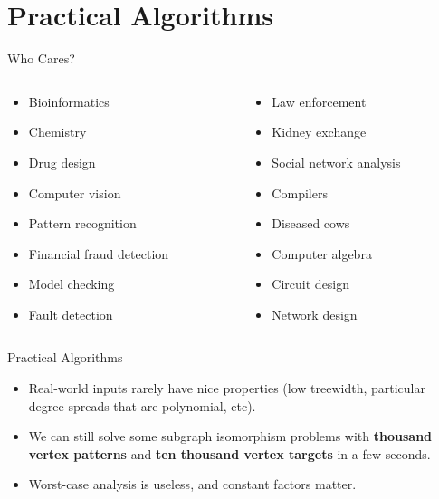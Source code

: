 \documentclass{beamer}
\begin{document}
\section{Practical Algorithms}

\begin{frame}{Who Cares?}
    \begin{columns}
        \begin{column}{0.45\textwidth}
            \begin{itemize}
                \item Bioinformatics
                \item Chemistry
                \item Drug design
                \item Computer vision
                \item Pattern recognition
                \item Financial fraud detection
                \item Model checking
                \item Fault detection
            \end{itemize}
        \end{column}
        \begin{column}{0.45\textwidth}
            \begin{itemize}
                \item Law enforcement
                \item Kidney exchange
                \item Social network analysis
                \item Compilers
                \item Diseased cows
                \item Computer algebra
                \item Circuit design
                \item Network design
            \end{itemize}
        \end{column}
    \end{columns}
\end{frame}

\begin{frame}{Practical Algorithms}
    \begin{itemize}
        \item Real-world inputs rarely have nice properties (low treewidth, particular degree
            spreads that are polynomial, etc).

        \item We can still solve some subgraph isomorphism problems with \textbf{thousand vertex
            patterns} and \textbf{ten thousand vertex targets} in a few seconds.

        \item Worst-case analysis is useless, and constant factors matter.
    \end{itemize}
\end{frame}
\end{document}
